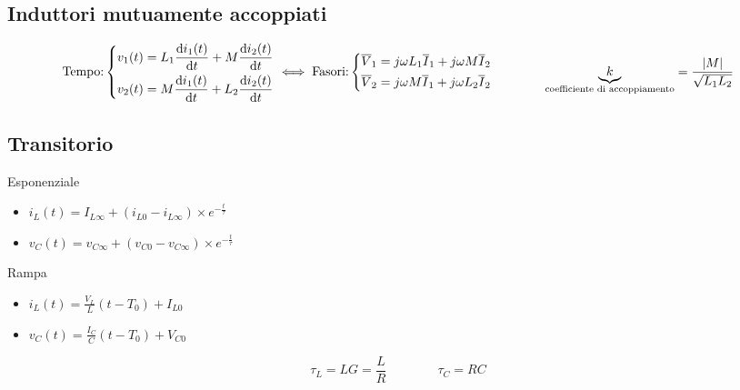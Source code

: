 \documentclass[10pt]{article}
\begin{document}
    \vspace{-\baselineskip}
    \subsection*{Induttori mutuamente accoppiati}

        \[
            \text{Tempo:}
            \left\{
                \begin{gathered}
                    v_1 (t) = L_1 \dv{i_1 (t)}{t} + M \dv{i_2 (t)}{t}\\
                    v_2 (t) = M \dv{i_1 (t)}{t} + L_2 \dv{i_2 (t)}{t}
                \end{gathered}
            \right.
            \iff
            \text{Fasori:}
            \left\{
                \begin{gathered}
                    \overline{V}_1 = j \omega L_1 \overline{I}_1 + j \omega M \overline{I}_2\\
                    \overline{V}_2 = j \omega M \overline{I}_1 + j \omega L_2 \overline{I}_2
                \end{gathered}
            \right.
            \qquad\qquad
            \underbrace{k}_{\text{coefficiente di accoppiamento}} = \frac{|M|}{\sqrt{L_1 L_2}}
        \]

    \vspace{-1.5\baselineskip}
    \subsection*{Transitorio}
    \vspace{-1.5\baselineskip}

        \begin{multicols}{3}
            
            Esponenziale
            \begin{itemize}
                \item \(i_L (t) = I_{L \infty} + (i_{L0} - i_{L\infty}) \times e^{-\frac{t}{\tau}}\)
                \item \(v_C (t) = v_{C \infty} + (v_{C 0} - v_{C \infty}) \times e^{-\frac{t}{\tau}}\)
            \end{itemize}

            \vfill\null
            \columnbreak

            Rampa
            \begin{itemize}
                \item \(i_L (t) = \frac{V_L}{L} (t - T_0) + I_{L0}\)
                \item \(v_C (t) = \frac{I_C}{C} (t - T_0) + V_{C0}\)
            \end{itemize}

            \vfill\null
            \columnbreak

            \[
                \tau_L = LG = \frac{L}{R}
                \qquad\qquad
                \tau_C = RC
            \]

        \end{multicols}
\end{document}
